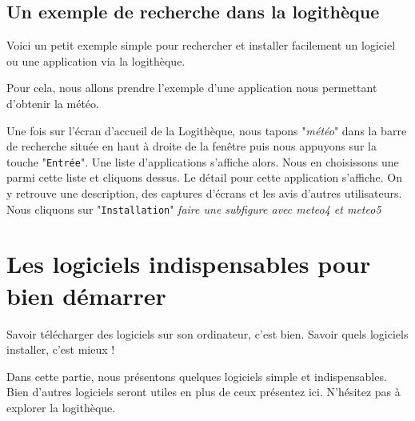 \documentclass[12pt]{book}
\begin{document}
	\subsection{Un exemple de recherche dans la logithèque}\label{sec:exlogitheque}
		Voici un petit exemple simple pour rechercher et installer facilement un logiciel ou une application via la logithèque.\par
		Pour cela, nous allons prendre l'exemple d'une application nous permettant d'obtenir la météo.\par
		Une fois sur l'écran d'accueil de la Logithèque, nous tapons "\textit{météo}" dans la barre de recherche située en haut à droite de la fenêtre puis nous appuyons sur la touche "\texttt{Entrée}".
		Une liste d'applications s'affiche alors. 
		Nous en choisissons une parmi cette liste et cliquons dessus.
		Le détail pour cette application s'affiche.
		On y retrouve une description, des captures d'écrans et les avis d'autres utilisateurs.
		Nous cliquons sur "\texttt{Installation}"
		\textit{faire une subfigure avec meteo4 et meteo5}
\section{Les logiciels indispensables pour bien démarrer}
Savoir télécharger des logiciels sur son ordinateur, c'est bien.
Savoir quels logiciels installer, c'est mieux !\par
Dans cette partie, nous présentons quelques logiciels simple et indispensables.
Bien d'autres logiciels seront utiles en plus de ceux présentez ici.
N'hésitez pas à explorer la logithèque.
\end{document}
